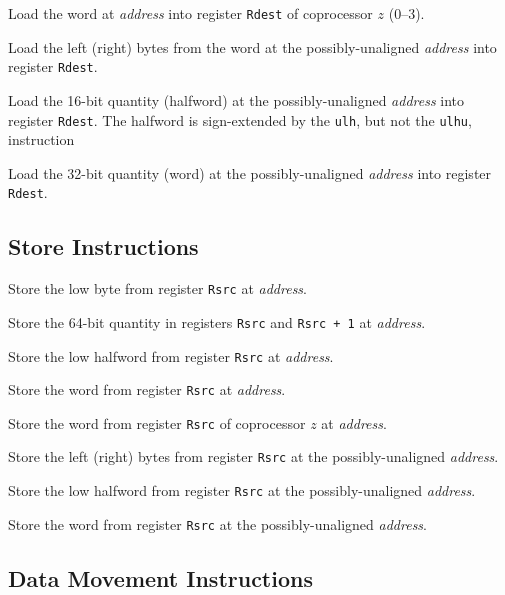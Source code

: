 \documentclass[11pt]{article}
\begin{document}
Load the word at {\em address\/} into register {\tt Rdest} of
coprocessor $z$ (0--3).

Load the left (right) bytes from the word at the possibly-unaligned
{\em address\/} into register {\tt Rdest}.

Load the 16-bit quantity (halfword) at the possibly-unaligned {\em
address\/} into register {\tt Rdest}.  The halfword is sign-extended
by the {\tt ulh}, but not the {\tt ulhu}, instruction

Load the 32-bit quantity (word) at the possibly-unaligned {\em
address\/}  into register {\tt Rdest}.


\subsection {Store Instructions}

Store the low byte from register {\tt Rsrc} at {\em address\/}.

Store the 64-bit quantity in registers {\tt Rsrc} and {\tt Rsrc
+ 1} at {\em address\/}.

Store the low halfword from register {\tt Rsrc} at {\em address\/}.

Store the word from register {\tt Rsrc} at {\em address\/}.

Store the word from register {\tt Rsrc} of coprocessor $z$ at
{\em address\/}.

Store the left (right) bytes from register {\tt Rsrc} at the
possibly-unaligned {\em address\/}.

Store the low halfword from register {\tt Rsrc} at the
possibly-unaligned {\em address\/}.

Store the word from register {\tt Rsrc} at the possibly-unaligned
{\em address\/}.


\subsection{Data Movement Instructions}
\end{document}
